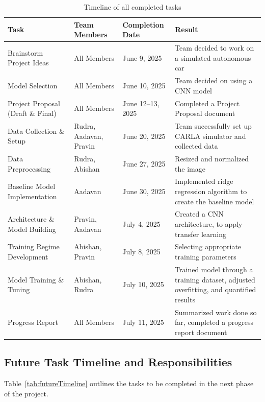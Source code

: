 \documentclass{article} %
\begin{document}
\begin{table}[h!]
\centering
\caption{Timeline of all completed tasks}
\begin{tabular}{|p{2.5cm}|p{3cm}|p{3cm}|p{5.5cm}|}
\hline
\textbf{Task} & \textbf{Team Members} & \textbf{Completion Date} & \textbf{Result} \\
\hline
Brainstorm Project Ideas & All Members & June 9, 2025 & Team decided to work on a simulated autonomous car \\
\hline
Model Selection & All Members & June 10, 2025 & Team decided on using a CNN model \\
\hline
Project Proposal (Draft \& Final) & All Members & June 12--13, 2025 & Completed a Project Proposal document \\
\hline
Data Collection \& Setup & Rudra, Aadavan, Pravin & June 20, 2025 & Team successfully set up CARLA simulator and collected data \\
\hline
Data Preprocessing & Rudra, Abishan & June 27, 2025 & Resized and normalized the image \\
\hline
Baseline Model Implementation & Aadavan & June 30, 2025 & Implemented ridge regression algorithm to create the baseline model \\
\hline
Architecture \& Model Building & Pravin, Aadavan & July 4, 2025 & Created a CNN architecture, to apply transfer learning \\
\hline
Training Regime Development & Abishan, Pravin & July 8, 2025 & Selecting appropriate training parameters \\
\hline
Model Training \& Tuning & Abishan, Rudra & July 10, 2025 & Trained model through a training dataset, adjusted overfitting, and quantified results \\
\hline
Progress Report & All Members & July 11, 2025 & Summarized work done so far, completed a progress report document \\
\hline
\end{tabular}
\label{tab:currentTimeline}
\end{table}

\subsection{Future Task Timeline and Responsibilities}

Table~\ref{tab:futureTimeline} outlines the tasks to be completed in the next phase of the project.
\end{document}
